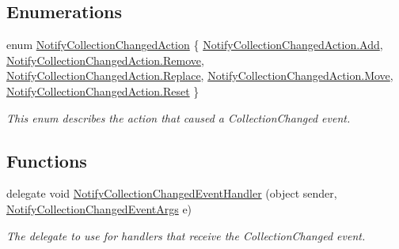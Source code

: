 \subsection*{Enumerations}
\begin{DoxyCompactItemize}
\item 
enum \hyperlink{namespace_system_1_1_collections_1_1_specialized_a7e21ea761562ed22011c3120bbb31123}{Notify\+Collection\+Changed\+Action} \{ \newline
\hyperlink{namespace_system_1_1_collections_1_1_specialized_a7e21ea761562ed22011c3120bbb31123aec211f7c20af43e742bf2570c3cb84f9}{Notify\+Collection\+Changed\+Action.\+Add}, 
\hyperlink{namespace_system_1_1_collections_1_1_specialized_a7e21ea761562ed22011c3120bbb31123a1063e38cb53d94d386f21227fcd84717}{Notify\+Collection\+Changed\+Action.\+Remove}, 
\hyperlink{namespace_system_1_1_collections_1_1_specialized_a7e21ea761562ed22011c3120bbb31123a0ebe6df8a3ac338e0512acc741823fdb}{Notify\+Collection\+Changed\+Action.\+Replace}, 
\hyperlink{namespace_system_1_1_collections_1_1_specialized_a7e21ea761562ed22011c3120bbb31123a6bc362dbf494c61ea117fe3c71ca48a5}{Notify\+Collection\+Changed\+Action.\+Move}, 
\newline
\hyperlink{namespace_system_1_1_collections_1_1_specialized_a7e21ea761562ed22011c3120bbb31123a526d688f37a86d3c3f27d0c5016eb71d}{Notify\+Collection\+Changed\+Action.\+Reset}
 \}\begin{DoxyCompactList}\small\item\em This enum describes the action that caused a Collection\+Changed event. \end{DoxyCompactList}
\end{DoxyCompactItemize}
\subsection*{Functions}
\begin{DoxyCompactItemize}
\item 
delegate void \hyperlink{namespace_system_1_1_collections_1_1_specialized_af0fd13c7ac27802127a046f55bf0b789}{Notify\+Collection\+Changed\+Event\+Handler} (object sender, \hyperlink{class_system_1_1_collections_1_1_specialized_1_1_notify_collection_changed_event_args}{Notify\+Collection\+Changed\+Event\+Args} e)
\begin{DoxyCompactList}\small\item\em The delegate to use for handlers that receive the Collection\+Changed event. \end{DoxyCompactList}\end{DoxyCompactItemize}


